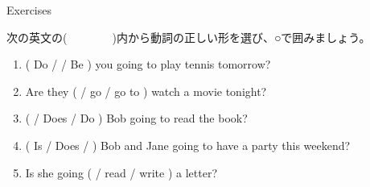 \documentclass[aspectratio=169,xcolor={dvipsnames,table}]{beamer}
\newcommand{\myaudio}[1]{\href{#1}{\faVolumeUp}}
\begin{document}
\begin{frame}[plain]{Exercises}

次の英文の(~~~~~~~~)内から動詞の正しい形を選び、○で囲みましょう。

\begin{enumerate}
 \item ( Do /  / Be )  you going to play tennis tomorrow?
 \item Are they (  / go  / go to ) watch a movie tonight?
 \item  (  / Does / Do ) Bob going to read the book?
 \item ( Is / Does /   ) Bob and Jane going to have a party this weekend?
 \item  Is she going (  / read  / write ) a letter?
\end{enumerate}
\hfill\myaudio{./audio/011_be_going_to_07.mp3}

 \end{frame}
\end{document}
